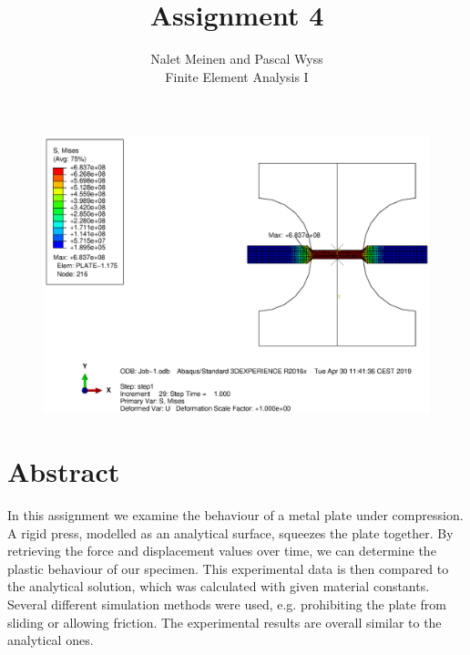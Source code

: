 \documentclass[12pt]{article}
\begin{document}


\title{Assignment 4}%
\author{Nalet Meinen and Pascal Wyss\\ %
Finite Element Analysis I
}
\maketitle

\begin{figure}[!htb]
  \centering
  \vspace*{1cm}
  \includegraphics[trim={10cm 4cm 12cm 1cm},clip,width=1.0\linewidth]{pics/titelbild}
\end{figure}

\newpage

\section*{Abstract}
In this assignment we examine the behaviour of a metal plate under compression.
A rigid press, modelled as an analytical surface, squeezes the plate together.
By retrieving the force and displacement values over time, we can determine the plastic 
behaviour of our specimen. 
This experimental data is then compared to the analytical solution,
which was calculated with given material constants.
Several different simulation methods were used, e.g. prohibiting the plate from sliding or allowing friction.
The experimental results are overall similar to the analytical ones.
\end{document}
